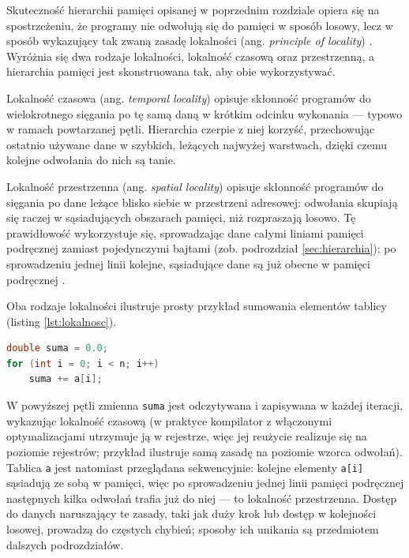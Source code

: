 \documentclass[a4paper,12pt]{book} %
\begin{document}
Skuteczność hierarchii pamięci opisanej w poprzednim rozdziale opiera się na spostrzeżeniu, że programy nie odwołują się do pamięci w sposób losowy, lecz w sposób wykazujący tak zwaną zasadę lokalności (ang. \emph{principle of locality}) \cite{hennessy2017architecture}. Wyróżnia się dwa rodzaje lokalności, lokalność czasową oraz przestrzenną, a hierarchia pamięci jest skonstruowana tak, aby obie wykorzystywać.

Lokalność czasowa (ang. \emph{temporal locality}) opisuje skłonność programów do wielokrotnego sięgania po tę samą daną w krótkim odcinku wykonania --- typowo w ramach powtarzanej pętli. Hierarchia czerpie z niej korzyść, przechowując ostatnio używane dane w szybkich, leżących najwyżej warstwach, dzięki czemu kolejne odwołania do nich są tanie.

Lokalność przestrzenna (ang. \emph{spatial locality}) opisuje skłonność programów do sięgania po dane leżące blisko siebie w przestrzeni adresowej: odwołania skupiają się raczej w sąsiadujących obszarach pamięci, niż rozpraszają losowo. Tę prawidłowość wykorzystuje się, sprowadzając dane całymi liniami pamięci podręcznej zamiast pojedynczymi bajtami (zob. podrozdział \ref{sec:hierarchia}); po sprowadzeniu jednej linii kolejne, sąsiadujące dane są już obecne w pamięci podręcznej \cite{drepper2007memory}.

Oba rodzaje lokalności ilustruje prosty przykład sumowania elementów tablicy (listing \ref{lst:lokalnosc}).

\begin{lstfloat}[H]
\begin{lstlisting}[language=C, caption={Sumowanie elementów tablicy ilustrujące lokalność czasową i przestrzenną}, label={lst:lokalnosc}]
double suma = 0.0;
for (int i = 0; i < n; i++)
    suma += a[i];
\end{lstlisting}
\end{lstfloat}

W powyższej pętli zmienna \texttt{suma} jest odczytywana i zapisywana w każdej iteracji, wykazując lokalność czasową (w praktyce kompilator z włączonymi optymalizacjami utrzymuje ją w rejestrze, więc jej reużycie realizuje się na poziomie rejestrów; przykład ilustruje samą zasadę na poziomie wzorca odwołań). Tablica \texttt{a} jest natomiast przeglądana sekwencyjnie: kolejne elementy \texttt{a[i]} sąsiadują ze sobą w pamięci, więc po sprowadzeniu jednej linii pamięci podręcznej następnych kilka odwołań trafia już do niej --- to lokalność przestrzenna. Dostęp do danych naruszający te zasady, taki jak duży krok lub dostęp w kolejności losowej, prowadzą do częstych chybień; sposoby ich unikania są przedmiotem dalszych podrozdziałów.
\end{document}
